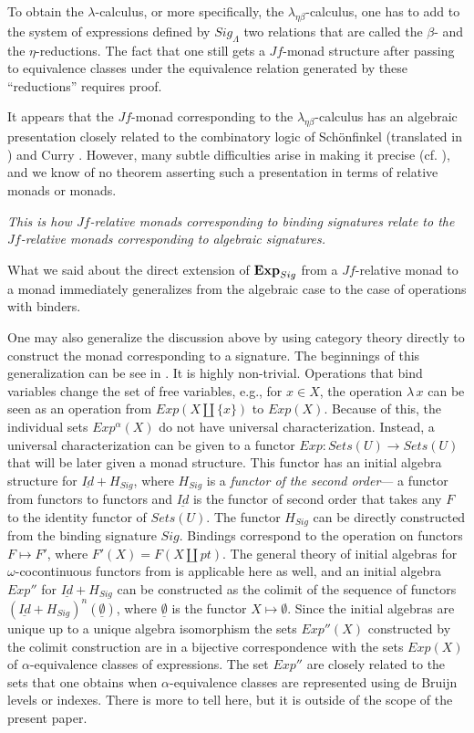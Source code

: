 \documentclass[12pt]{amsart}
\newcommand{\sr}{\rightarrow}
\newcommand{\uu}{\underline}
\begin{document}
To obtain the $\lambda$-calculus, or more specifically, the
$\lambda_{\eta\beta}$-calculus, one has to add to the system of expressions
defined by $Sig_{\Lambda}$ two relations that are called the $\beta$- and the
$\eta$-reductions. The fact that one still gets a $Jf$-monad structure after
passing to equivalence classes under the equivalence relation generated by
these ``reductions'' requires proof.

It appears that the $Jf$-monad corresponding to the
$\lambda_{\eta\beta}$-calculus has an algebraic presentation closely related to
the combinatory logic of Schönfinkel \cite{Schonfinkel1924} (translated in
\cite{FtoG}) and Curry \cite{Curry1930}.  However, many subtle difficulties arise
in making it precise (cf.{} \cite{2002Selinger}), and we know of no theorem
asserting such a presentation in terms of relative monads or monads.

{\em This is how $Jf$-relative monads corresponding to binding signatures
  relate to the $Jf$-relative monads corresponding to algebraic signatures.}

What we said about the direct extension of ${\bf Exp}_{Sig}$ from a
$Jf$-relative monad to a monad immediately generalizes from the algebraic case
to the case of operations with binders.

One may also generalize the discussion above by using category theory directly
to construct the monad corresponding to a signature.  The beginnings
of this generalization can be see in \cite{FPT}. It is highly non-trivial.
Operations that bind variables change the set of free variables, e.g., for $x\in
X$, the operation $\lambda\,x$ can be seen as an operation from
$Exp(X\coprod\{x\})$ to $Exp(X)$. Because of this, the individual sets
$Exp^{\alpha}(X)$ do not have universal characterization. Instead, a universal
characterization can be given to a functor $Exp:Sets(U)\sr Sets(U)$ that will
be later given a monad structure. This functor has an initial algebra structure
for $\uu{Id}+H_{Sig}$, where $H_{Sig}$ is a {\em functor of the second order}---%
a functor from functors to functors and $\uu{Id}$ is the functor of second
order that takes any $F$ to the identity functor of $Sets(U)$. The functor
$H_{Sig}$ can be directly constructed from the binding signature
$Sig$. Bindings correspond to the operation on functors $F\mapsto F'$, where
$F'(X)=F(X\coprod pt)$. The general theory of initial algebras for
$\omega$-cocontinuous functors from \cite{Adamek1974} is applicable here as
well, and an initial algebra $Exp''$ for $\uu{Id}+H_{Sig}$ can be constructed as
the colimit of the sequence of functors $(\uu{Id}+H_{Sig})^n(\uu{\emptyset})$,
where $\uu{\emptyset}$ is the functor $X\mapsto \emptyset$. Since the initial
algebras are unique up to a unique algebra isomorphism the sets $Exp''(X)$
constructed by the colimit construction are in a bijective correspondence with
the sets $Exp(X)$ of $\alpha$-equivalence classes of expressions. The set
$Exp''$ are closely related to the sets that one obtains when 
$\alpha$-equivalence classes are represented using de Bruijn levels or indexes. 
There is more
to tell here, but it is outside of the scope of the present
paper.
\end{document}
